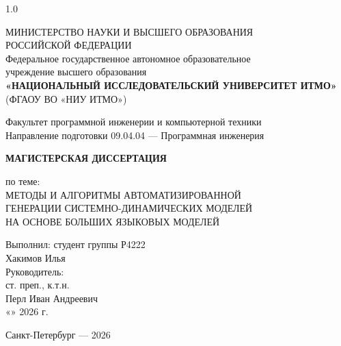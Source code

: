 \begin{titlepage}
    \thispagestyle{empty}
    \begin{spacing}{1.0}
    \setlength{\parindent}{0pt}
    \begin{center}
        \small
        МИНИСТЕРСТВО НАУКИ И ВЫСШЕГО ОБРАЗОВАНИЯ\\
        РОССИЙСКОЙ ФЕДЕРАЦИИ\\[6pt]
        Федеральное государственное автономное образовательное\\
        учреждение высшего образования\\
        \textbf{«НАЦИОНАЛЬНЫЙ ИССЛЕДОВАТЕЛЬСКИЙ УНИВЕРСИТЕТ ИТМО»}\\
        (ФГАОУ ВО «НИУ ИТМО»)

        \vspace{1.2cm}
        Факультет программной инженерии и компьютерной техники\\[4pt]
        Направление подготовки 09.04.04 --- Программная инженерия

        \vspace{1.6cm}
        \large\bfseries
        МАГИСТЕРСКАЯ ДИССЕРТАЦИЯ

        \vspace{0.8cm}
        по теме:\\[0.4cm]
        \Large
        МЕТОДЫ И АЛГОРИТМЫ АВТОМАТИЗИРОВАННОЙ\\
        ГЕНЕРАЦИИ СИСТЕМНО-ДИНАМИЧЕСКИХ МОДЕЛЕЙ\\
        НА ОСНОВЕ БОЛЬШИХ ЯЗЫКОВЫХ МОДЕЛЕЙ
    \end{center}

    \vspace{1.7cm}
    \begin{flushright}
        \begin{minipage}{0.53\textwidth}
            \small
            Выполнил: студент группы Р4222\\[5pt]
            Хакимов Илья\\[12pt]
            Руководитель:\\[4pt]
            ст. преп., к.т.н.\\[4pt]
            Перл Иван Андреевич\\[12pt]
            «\underline{\hspace{1cm}}» \underline{\hspace{3cm}} 2026 г.
        \end{minipage}
    \end{flushright}

    \vfill
    \begin{center}
        \small Санкт-Петербург --- 2026
    \end{center}
    \end{spacing}
\end{titlepage}
